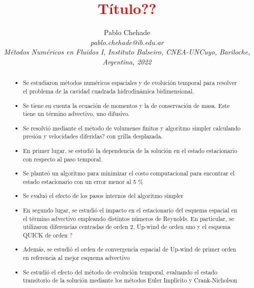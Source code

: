 \documentclass[aps,prb,twocolumn,superscriptaddress,floatfix,longbibliography,10pt]{revtex4-2}
\newcounter{para}
\begin{document}
\newcommand{\mytitle}{\textcolor{red}{Título??}}

\title{\mytitle}

\author{Pablo Chehade \\
    \small \textit{pablo.chehade@ib.edu.ar} \\
    \small \textit{Métodos Numéricos en Fluidos I, Instituto Balseiro, CNEA-UNCuyo, Bariloche, Argentina, 2022} \\}


\begin{abstract}

\begin{itemize}
  \item Se estudiaron métodos numéricos espaciales y de evolución temporal para resolver el problema de la cavidad cuadrada hidrodinámica bidimensional.
  \item Se tiene en cuenta la ecuación de momentos y la de conservación de masa. Este tiene un término advectivo, uno difusivo.
  \item Se resolvió mediante el método de volumenes finitos y algoritmo simpler calculando presión y velocidades diferidas? con grilla desplazada.
  \item En primer lugar, se estudió la dependencia de la solución en el estado estacionario con respecto al paso temporal.
  \item Se planteó un algoritmo para minimizar el costo computacional para encontrar el estado estacionario con un error menor al 5 \%
  \item Se evaluó el efecto de los pasos internos del algoritmo simpler
  \item En segundo lugar, se estudió el impacto en el estacionario del esquema espacial en el término advectivo empleando distintos números de Reynolds. En particular, se utilizaron diferencias centradas de orden 2, Up-wind de orden uno y el esquema QUICK de orden \textcolor{red}{?}
  \item Además, se estudió el orden de convergencia espacial de Up-wind de primer orden en referencia al mejor esquema advectivo
  \item Se estudió el efecto del método de evolución temporal, evaluando el estado transitorio de la solución mediante los métodos Euler Implícito y Crank-Nicholson
\end{itemize}


\end{abstract}

\maketitle
\end{document}
